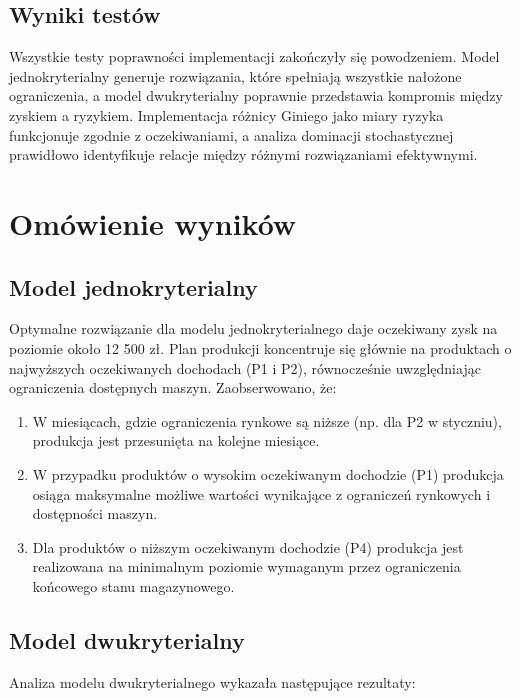 \documentclass[12pt]{article}
\begin{document}
\subsection{Wyniki testów}

Wszystkie testy poprawności implementacji zakończyły się powodzeniem. Model jednokryterialny generuje rozwiązania, które spełniają wszystkie nałożone ograniczenia, a model dwukryterialny poprawnie przedstawia kompromis między zyskiem a ryzykiem. Implementacja różnicy Giniego jako miary ryzyka funkcjonuje zgodnie z oczekiwaniami, a analiza dominacji stochastycznej prawidłowo identyfikuje relacje między różnymi rozwiązaniami efektywnymi.

\section{Omówienie wyników}

\subsection{Model jednokryterialny}

Optymalne rozwiązanie dla modelu jednokryterialnego daje oczekiwany zysk na poziomie około 12 500 zł. Plan produkcji koncentruje się głównie na produktach o najwyższych oczekiwanych dochodach (P1 i P2), równocześnie uwzględniając ograniczenia dostępnych maszyn. Zaobserwowano, że:

\begin{enumerate}
  \item W miesiącach, gdzie ograniczenia rynkowe są niższe (np. dla P2 w styczniu), produkcja jest przesunięta na kolejne miesiące.
  \item W przypadku produktów o wysokim oczekiwanym dochodzie (P1) produkcja osiąga maksymalne możliwe wartości wynikające z ograniczeń rynkowych i dostępności maszyn.
  \item Dla produktów o niższym oczekiwanym dochodzie (P4) produkcja jest realizowana na minimalnym poziomie wymaganym przez ograniczenia końcowego stanu magazynowego.
\end{enumerate}

\subsection{Model dwukryterialny}

Analiza modelu dwukryterialnego wykazała następujące rezultaty:
\end{document}
